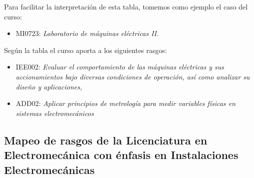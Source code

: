 Para facilitar la interpretación de esta tabla, tomemos como ejemplo el caso del curso:\par

\begin{itemize}
\item MI0723: \textit{Laboratorio de máquinas eléctricas II}\textit{.}
\end{itemize}
Según la tabla el curso aporta a los siguientes rasgos:\par

\begin{itemize}
\item IEE002: \textit{Evaluar el comportamiento de las máquinas }\textit{eléctricas}\textit{ y sus accionamientos bajo diversas condiciones de operación, así como analizar su diseño y aplicaciones}\textit{,}
\item ADD02: \textit{Aplicar principios de metrología para medir variables físicas en sistemas electromecánicos}
\end{itemize}
\subsection*{Mapeo de rasgos de la Licenciatura en Electromecánica con énfasis en Instalaciones Electromecánicas}

